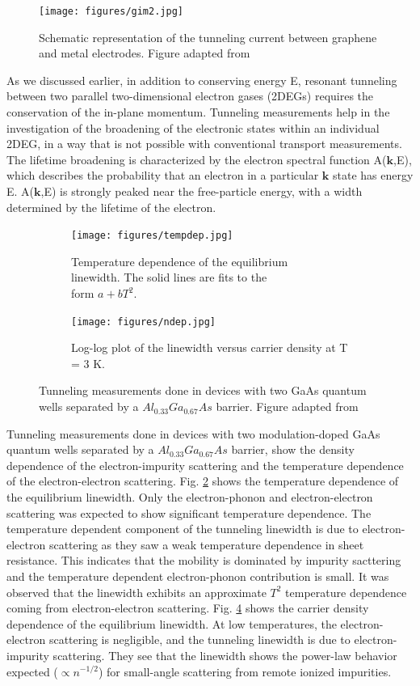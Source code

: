 \begin{figure}[H]
	\centering
	\texttt{[image: figures/gim2.jpg]}
	\caption{Schematic representation of the tunneling current between graphene and metal electrodes. Figure adapted from \cite{chaves2013model}}
	\label{fig:gim2}
\end{figure}
As we discussed earlier, in addition to conserving energy E, resonant tunneling between two parallel two-dimensional electron gases (2DEGs) requires the conservation of the in-plane momentum. Tunneling measurements help in the investigation of the broadening of the electronic states within an individual 2DEG, in a way that is not possible with conventional transport measurements. The lifetime broadening is characterized by the electron spectral function A($\mathbf k$,E), which describes the probability that an electron in a particular $\mathbf k$ state has energy E. A($\mathbf k$,E) is strongly peaked near the free-particle energy, with a width determined by the lifetime of the electron.

\begin{figure}[H]
	\centering
	\begin{subfigure}{.5\linewidth}
		\centering
		\texttt{[image: figures/tempdep.jpg]}
		\caption{Temperature dependence of the equilibrium \\linewidth. The solid lines are fits to the \\form $a+bT^2$.}
		\label{fig:tempdep}
	\end{subfigure}%
	\begin{subfigure}{.5\linewidth}
		\centering
		\texttt{[image: figures/ndep.jpg]}
		\caption{Log-log plot of the linewidth versus carrier density at T = 3 K.}
		\label{fig:ndep}
	\end{subfigure}
	\caption{Tunneling measurements done in devices with two GaAs quantum wells separated by a $Al_{0.33}Ga_{0.67}As$ barrier. Figure adapted from \cite{Ritchie}}
\end{figure}

Tunneling measurements done in devices with two modulation-doped GaAs quantum wells separated by a $Al_{0.33}Ga_{0.67}As$ barrier, \cite{Ritchie} show the density dependence of the electron-impurity scattering and the temperature dependence of the electron-electron scattering. Fig. \ref{fig:tempdep} shows the temperature dependence of the equilibrium linewidth. Only the electron-phonon and electron-electron scattering was expected to show significant temperature dependence. The temperature dependent component of the tunneling linewidth is due to electron-electron scattering as they saw a weak temperature dependence in sheet resistance. This indicates that the mobility is dominated by impurity sacttering and the temperature dependent electron-phonon contribution is small. It was observed that the linewidth exhibits an approximate $T^2$ temperature dependence coming from electron-electron scattering. Fig. \ref{fig:ndep} shows the carrier density dependence of the equilibrium linewidth. At low temperatures, the electron-electron scattering is negligible, and the tunneling linewidth is due to electron-impurity scattering. They see that the linewidth shows the power-law behavior expected ($\propto n^{-1/2}$) for small-angle scattering from remote ionized impurities.

